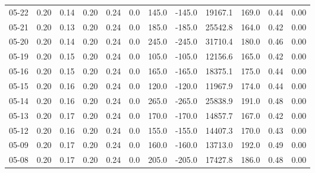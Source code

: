 \begin{threeparttable}
{\begin{tabular}{lrrrrrrrrrrr}
  05-22 &          0.20 &          0.14 &          0.20 &        0.24 &                 0.0 &               145.0 &     -145.0 &             19167.1 &            169.0 &            0.44 &                   0.00 \\
  05-21 &          0.20 &          0.13 &          0.20 &        0.24 &                 0.0 &               185.0 &     -185.0 &             25542.8 &            164.0 &            0.42 &                   0.00 \\
  05-20 &          0.20 &          0.14 &          0.20 &        0.24 &                 0.0 &               245.0 &     -245.0 &             31710.4 &            180.0 &            0.46 &                   0.00 \\
  05-19 &          0.20 &          0.15 &          0.20 &        0.24 &                 0.0 &               105.0 &     -105.0 &             12156.6 &            165.0 &            0.42 &                   0.00 \\
  05-16 &          0.20 &          0.15 &          0.20 &        0.24 &                 0.0 &               165.0 &     -165.0 &             18375.1 &            175.0 &            0.44 &                   0.00 \\
  05-15 &          0.20 &          0.16 &          0.20 &        0.24 &                 0.0 &               120.0 &     -120.0 &             11967.9 &            174.0 &            0.44 &                   0.00 \\
  05-14 &          0.20 &          0.16 &          0.20 &        0.24 &                 0.0 &               265.0 &     -265.0 &             25838.9 &            191.0 &            0.48 &                   0.00 \\
  05-13 &          0.20 &          0.17 &          0.20 &        0.24 &                 0.0 &               170.0 &     -170.0 &             14857.7 &            167.0 &            0.42 &                   0.00 \\
  05-12 &          0.20 &          0.16 &          0.20 &        0.24 &                 0.0 &               155.0 &     -155.0 &             14407.3 &            170.0 &            0.43 &                   0.00 \\
  05-09 &          0.20 &          0.17 &          0.20 &        0.24 &                 0.0 &               160.0 &     -160.0 &             13713.0 &            192.0 &            0.49 &                   0.00 \\
  05-08 &          0.20 &          0.17 &          0.20 &        0.24 &                 0.0 &               205.0 &     -205.0 &             17427.8 &            186.0 &            0.48 &                   0.00 \\

\end{tabular}}
\end{threeparttable}
